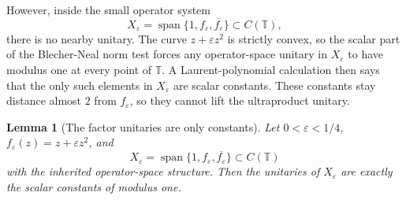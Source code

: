 \documentclass[11pt]{article}
\newtheorem{lemma}{Lemma}
\newcommand{\T}{\mathbb T}
\begin{document}
However, inside the small operator system
\[
X_\varepsilon=\operatorname{span}\{1,f_\varepsilon,\overline{f_\varepsilon}\}\subset C(\T),
\]
there is no nearby unitary.  The curve \(z+\varepsilon z^2\) is strictly convex, so the scalar part of the Blecher-Neal norm test forces any operator-space unitary in \(X_\varepsilon\) to have modulus one at every point of \(\T\).  A Laurent-polynomial calculation then says that the only such elements in \(X_\varepsilon\) are scalar constants.  These constants stay distance almost \(2\) from \(f_\varepsilon\), so they cannot lift the ultraproduct unitary.

\begin{lemma}[The factor unitaries are only constants]\label{lem:factor}
Let \(0<\varepsilon<1/4\), \(f_\varepsilon(z)=z+\varepsilon z^2\), and
\[
X_\varepsilon=\operatorname{span}\{1,f_\varepsilon,\overline{f_\varepsilon}\}\subset C(\T)
\]
with the inherited operator-space structure.  Then the unitaries of \(X_\varepsilon\) are exactly the scalar constants of modulus one.
\end{lemma}
\end{document}
